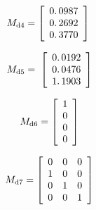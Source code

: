 \documentclass[11pt]{article}
\begin{document}
\vspace{1em}

\begin{par}
	$$M_{\mathrm{d4}} =\left\lbrack \begin{array}{c}\linebreak 
	0\ldotp 0987\\\linebreak 
	0\ldotp 2692\\\linebreak 
	0\ldotp 3770\linebreak 
	\end{array}\right\rbrack \;$$
\end{par}

\vspace{1em}

\begin{par}
	$$M_{\mathrm{d5}} =\;\left\lbrack \begin{array}{c}\linebreak 
	0\ldotp 0192\\\linebreak 
	0\ldotp 0476\\\linebreak 
	1\ldotp 1903\linebreak 
	\end{array}\right\rbrack$$
\end{par}

\vspace{1em}

\begin{par}
	$$M_{\mathrm{d6}} =\left\lbrack \begin{array}{c}\linebreak 
	1\\\linebreak 
	0\\\linebreak 
	0\\\linebreak 
	0\linebreak 
	\end{array}\right\rbrack$$
\end{par}

\vspace{1em}

\begin{par}
	$$M_{\mathrm{d7}} =\left\lbrack \begin{array}{ccc}\linebreak 
	0 & 0 & 0\\\linebreak 
	1 & 0 & 0\\\linebreak 
	0 & 1 & 0\\\linebreak 
	0 & 0 & 1\linebreak 
	\end{array}\right\rbrack$$
\end{par}
\end{document}
